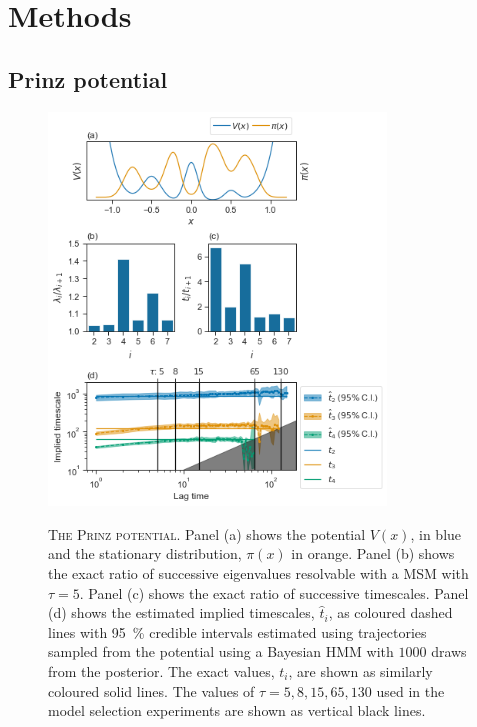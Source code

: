 \section{Methods} \label{sec:hmm_methods}
\subsection{Prinz potential}
\begin{figure}[p]
    \centering
    \caption[The Prinz potential]{\textsc{The Prinz potential}. Panel (a) shows the potential $V(x)$, in blue and the stationary distribution, $\pi(x)$ in orange. Panel (b) shows the exact ratio of successive eigenvalues resolvable with a MSM with $\tau=5$. Panel (c) shows the exact ratio of successive timescales. Panel (d) shows the estimated implied timescales, $\hat{t}_{i}$, as coloured dashed lines with \SI{95}{\percent} credible intervals estimated using trajectories sampled from the potential using a Bayesian HMM with $1000$ draws from the posterior. The exact values, $t_{i}$, are shown as similarly coloured solid lines. The values of $\tau = 5, 8, 15, 65, 130$ used in the model selection experiments are shown as vertical black lines.}
    \includegraphics[width=0.8\textwidth]{chapters/hmm_selection/figures/prinz_pot.png}
    \label{fig:prinz_pot}
\end{figure}

